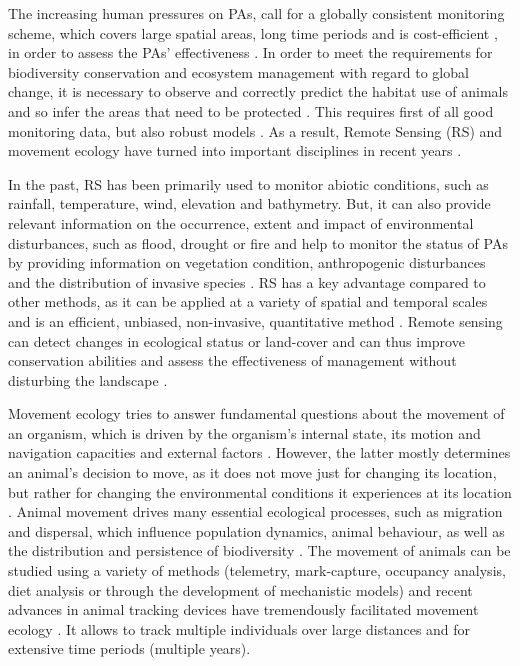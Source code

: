 \documentclass[12pt,a4paper, twoside, english]{article}
\begin{document}
The increasing human pressures on PAs, call for a globally consistent monitoring scheme, which covers large spatial areas, long time periods and is cost-efficient \citep{Nicholson2006, Henry2008, Scholes2008}, in order to assess the PAs' effectiveness \citep{Nagendra2013}. In order to meet the requirements for biodiversity conservation and ecosystem management with regard to global change, it is necessary to observe and correctly predict the habitat use of animals \citep{DeKnegt2011} and so infer the areas that need to be protected \citep{Widmann2015}. This requires first of all good monitoring data, but also robust models \citep{Honrado2016}. As a result, Remote Sensing (RS) and movement ecology have turned into important disciplines in recent years \citep{Turner2003a}.

In the past, RS has been primarily used to monitor abiotic conditions, such as rainfall, temperature, wind, elevation and bathymetry. But, it can also provide relevant information on the occurrence, extent and impact of environmental disturbances, such as flood, drought or fire and help to monitor the status of PAs by providing information on vegetation condition, anthropogenic disturbances and the distribution of invasive species \citep{Pettorelli2014, Nagendra2013}. RS has a key advantage compared to other methods, as it can be applied at a variety of spatial and temporal scales and is an efficient, unbiased, non-invasive, quantitative method \citep{Willis2015}. Remote sensing can detect changes in ecological status or land-cover and can thus improve conservation abilities and assess the effectiveness of management without disturbing the landscape \citep{Pettorelli2014, Willis2015, Wegmann2014}.

Movement ecology tries to answer fundamental questions about the movement of an organism, which is driven by the organism's internal state, its motion and navigation capacities and external factors \citep{Nathan2008}. However, the latter mostly determines an animal's decision to move, as it does not move just for changing its location, but rather for changing the environmental conditions it experiences at its location \citep{VanMoorter2016}. Animal movement drives many essential ecological processes, such as migration and dispersal, which influence population dynamics, animal behaviour, as well as the distribution and persistence of biodiversity \citep{Jeltsch2013, Barton2015, McClintock2014, Bauer2014}. The movement of animals can be studied using a variety of methods (telemetry, mark-capture, occupancy analysis, diet analysis or through the development of mechanistic models) \citep{Driscoll2014} and recent advances in animal tracking devices have tremendously facilitated movement ecology \citep{Cooke2004a, Wilson2008a, Rutz2009, Urbano2010}. It allows to track multiple individuals over large distances and for extensive time periods (multiple years). 
\end{document}
